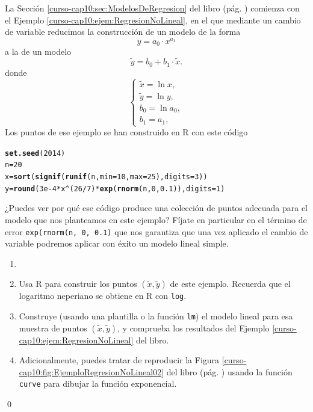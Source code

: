\documentclass[10pt,a4paper]{article}\usepackage[]{graphicx}\usepackage[]{color}
\makeatletter
\newcommand{\hlnum}[1]{\textcolor[rgb]{0.686,0.059,0.569}{#1}}%
\newcommand{\hlopt}[1]{\textcolor[rgb]{0,0,0}{#1}}%
\newcommand{\hlstd}[1]{\textcolor[rgb]{0.345,0.345,0.345}{#1}}%
\newcommand{\hlkwb}[1]{\textcolor[rgb]{0.69,0.353,0.396}{#1}}%
\newcommand{\hlkwc}[1]{\textcolor[rgb]{0.333,0.667,0.333}{#1}}%
\newcommand{\hlkwd}[1]{\textcolor[rgb]{0.737,0.353,0.396}{\textbf{#1}}}%
\newenvironment{kframe}{%
 \def\at@end@of@kframe{}%
 \ifinner\ifhmode%
  \def\at@end@of@kframe{\end{minipage}}%
  \begin{minipage}{\columnwidth}%
 \fi\fi%
 \def\FrameCommand##1{\hskip\@totalleftmargin \hskip-\fboxsep
 \colorbox{shadecolor}{##1}\hskip-\fboxsep
     \hskip-\linewidth \hskip-\@totalleftmargin \hskip\columnwidth}%
 \MakeFramed {\advance\hsize-\width
   \@totalleftmargin\z@ \linewidth\hsize
   \@setminipage}}%
 {\par\unskip\endMakeFramed%
 \at@end@of@kframe}
\newenvironment{knitrout}{}{} %
\makeatother
\begin{document}
La Sección \ref{curso-cap10:sec:ModelosDeRegresion} del libro (pág. \pageref{curso-cap10:sec:ModelosDeRegresion}) comienza con el Ejemplo \ref{curso-cap10:ejem:RegresionNoLineal}, en el que mediante un cambio de variable reducimos la construcción de un modelo de la forma
\[  y=a_0\cdot x^{a_1}\]
a la de un modelo
\[\tilde y=b_0+b_1\cdot\tilde x.\]
donde
\[
\begin{cases}
\tilde x=\ln x,\\
\tilde y=\ln y,\\
b_0=\ln a_0,\\
b_1=a_1,
\end{cases}
\]
Los puntos de ese ejemplo se han construido en R con este código
\begin{knitrout}
\color{fgcolor}\begin{kframe}
\begin{alltt}
\hlkwd{set.seed}\hlstd{(}\hlnum{2014}\hlstd{)}
\hlstd{n}\hlkwb{=}\hlnum{20}
\hlstd{x}\hlkwb{=}\hlkwd{sort}\hlstd{(}\hlkwd{signif}\hlstd{(}\hlkwd{runif}\hlstd{(n,}\hlkwc{min}\hlstd{=}\hlnum{10}\hlstd{,}\hlkwc{max}\hlstd{=}\hlnum{25}\hlstd{),}\hlkwc{digits}\hlstd{=}\hlnum{3}\hlstd{))}
\hlstd{y}\hlkwb{=}\hlkwd{round}\hlstd{(}\hlnum{3e-4} \hlopt{*} \hlstd{x}\hlopt{^}\hlstd{(}\hlnum{26}\hlopt{/}\hlnum{7}\hlstd{)} \hlopt{*} \hlkwd{exp}\hlstd{(}\hlkwd{rnorm}\hlstd{(n,} \hlnum{0}\hlstd{,} \hlnum{0.1}\hlstd{)),}\hlkwc{digits}\hlstd{=}\hlnum{1}\hlstd{)}
\end{alltt}
\end{kframe}
\end{knitrout}
¿Puedes ver por qué ese código produce una colección de puntos adecuada para el modelo que nos planteamos en este ejemplo? Fíjate en particular en el término de error {\tt exp(rnorm(n, 0, 0.1)} que nos garantiza que una vez aplicado el cambio de variable podremos aplicar con éxito un modelo lineal simple.

\begin{ejercicio}
\label{tut10:ejercicio09}
\begin{enumerate}
  \item[]
  \item Usa R para construir los puntos $(\tilde x, \tilde y)$ de este ejemplo. Recuerda que el logaritmo neperiano se obtiene en R con  {\tt log}.
  \item Construye (usando una plantilla o la función {\tt lm}) el modelo lineal para esa muestra de puntos $(\tilde x, \tilde y)$, y comprueba los resultados del Ejemplo \ref{curso-cap10:ejem:RegresionNoLineal} del libro.
  \item Adicionalmente, puedes tratar de reproducir la Figura \ref{curso-cap10:fig:EjemploRegresionNoLineal02} del libro (pág. \pageref{cap10:fig:EjemploRegresionNoLineal02}) usando la función {\tt curve} para dibujar la función exponencial.
\end{enumerate}
\qed
\end{ejercicio}
\end{document}
